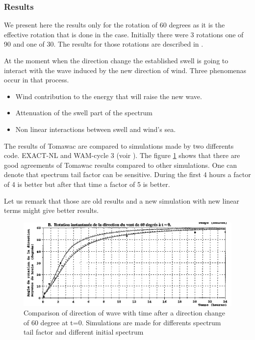%
%
\subsubsection{Results}
%
We present here the results only for the rotation of 60 degrees as it is the effective rotation that is done in the case. Initially there were 3 rotations one of 90 and one of 30. The results for those rotations are described in \cite{valid10TW}.

At the moment when the direction change the established swell is going to interact with the wave induced by the new direction of wind. Three phenomenas occur in that process. 
\begin {itemize}
\item Wind contribution to the energy that will raise the new wave.
\item Attenuation of the swell part of the spectrum
\item Non linear interactions between swell and wind's sea. 
\end{itemize}

The results of Tomawac are compared to simulations made by two differents code. EXACT-NL and WAM-cycle 3 (voir \cite{vledder}). The figure  \ref{resturnwind} shows that there are good agreements of Tomawac results compared to other simulations. One can denote that spectrum tail factor can be sensitive. During the first 4 hours a factor of 4 is better but after that time a factor of 5 is better. 

Let us remark that those are old results and a new simulation with new linear terms might give better results. 

\begin{figure} [!h]
\centering
\includegraphics[scale = 0.45]{resuTW60.png}
 \caption{Comparison of direction of wave with time after a direction change of 60 degree at t=0. Simulations are made for differents spectrum tail factor and different initial spectrum}
\label{resturnwind}
\end{figure}


